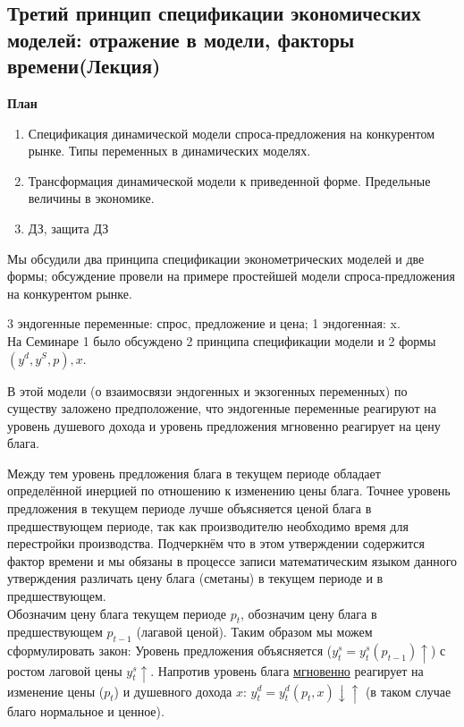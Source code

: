 \documentclass[12pt,a4paper]{article}
\author{Аверьянов Т.С.}
\begin{document}
\begin{center}
\section*{Третий принцип спецификации экономических моделей: отражение в модели, факторы времени(Лекция)}
\end{center}
\begin{center}
\textbf{План}
\end{center}
\begin{enumerate}
\item Спецификация динамической модели спроса-предложения на конкурентом рынке. Типы переменных в динамических моделях.
\item Трансформация динамической модели к приведенной форме. Предельные величины в экономике. 
\item ДЗ, защита ДЗ
\end{enumerate}

Мы обсудили два принципа спецификации эконометрических моделей и две формы; обсуждение провели на примере простейшей модели спроса-предложения на конкурентом рынке.

3 эндогенные переменные: спрос, предложение и цена; 1 эндогенная: x. \\
На Семинаре 1 было обсуждено 2 принципа спецификации модели и 2 формы $(y^d, y^S, p), x$.

В этой модели (о взаимосвязи эндогенных  и экзогенных переменных) по существу заложено предположение, что эндогенные переменные реагируют на уровень душевого дохода и уровень предложения мгновенно реагирует на цену блага.

Между тем уровень предложения блага в текущем периоде обладает определённой инерцией по отношению к изменению цены блага. Точнее уровень предложения в текущем периоде лучше объясняется ценой блага в предшествующем периоде, так как производителю необходимо время для перестройки производства. Подчеркнём что в этом утверждении содержится фактор времени и мы обязаны в процессе записи математическим языком данного утверждения различать цену блага (сметаны) в текущем периоде и в предшествующем.\\



Обозначим цену блага текущем периоде $p_t$, обозначим цену блага в предшествующем $p_{t-1}$ (лагавой ценой). Таким образом мы можем сформулировать закон: Уровень предложения объясняется ($y_t^s = y_t^s(p_{t-1})\uparrow$) с ростом лаговой цены $y_t^s \uparrow$. Напротив уровень блага \underline{мгновенно} реагирует на изменение цены ($p_t$) и душевного дохода $x$: $y_t^d = y_t^d(p_t, x)\downarrow \uparrow$ (в таком случае благо нормальное и ценное).
\end{document}
